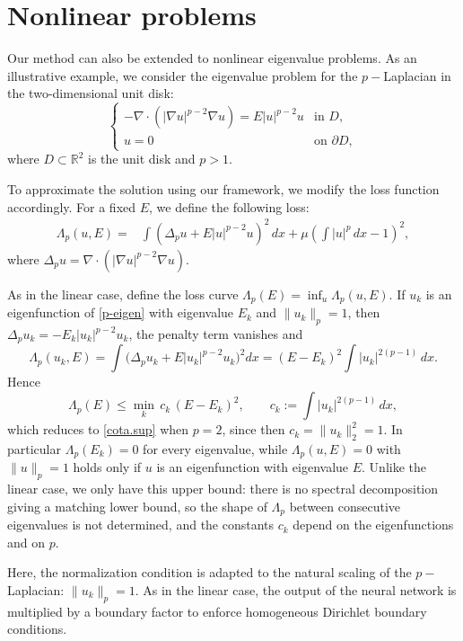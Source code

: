 \documentclass[11pt]{amsart}
\theoremstyle{definition}
\theoremstyle{remark}
\theoremstyle{plain}
\newcommand{\R}{\mathbb{R}}
\begin{document}
\section{Nonlinear problems} \label{sec.nolin}

Our method can also be extended to nonlinear eigenvalue problems. As an illustrative example, we consider the eigenvalue problem for the $p-$Laplacian in the two-dimensional unit disk:
\begin{equation}\label{p-eigen}
\begin{cases}
-\nabla \cdot (|\nabla u|^{p-2} \nabla u) = E |u|^{p-2} u & \text{in } D, \\
u = 0 & \text{on } \partial D,
\end{cases}
\end{equation}
where $D \subset \R^2$ is the unit disk and $p > 1$.

To approximate the solution using our framework, we modify the loss function accordingly. For a fixed $E$, we define the following loss:
\begin{align*}
\Lambda_p(u, E) = & \int \left( \Delta_p u + E |u|^{p-2} u \right)^2 \, dx + \mu \left( \int |u|^p\, dx - 1 \right)^2,
\end{align*}
where $\Delta_p u = \nabla \cdot (|\nabla u|^{p-2} \nabla u)$.

As in the linear case, define the loss curve
$\Lambda_p(E)=\inf_u \Lambda_p(u,E)$. If $u_k$ is an eigenfunction of
\eqref{p-eigen} with eigenvalue $E_k$ and $\|u_k\|_p=1$, then
$\Delta_p u_k=-E_k|u_k|^{p-2}u_k$, the penalty term vanishes and
\[
\Lambda_p(u_k,E)=\int\big(\Delta_p u_k+E|u_k|^{p-2}u_k\big)^2dx
=(E-E_k)^2\int |u_k|^{2(p-1)}\,dx .
\]
Hence
\[
\Lambda_p(E)\le \min_k\, c_k\,(E-E_k)^2,
\qquad c_k:=\int |u_k|^{2(p-1)}\,dx ,
\]
which reduces to \eqref{cota.sup} when $p=2$, since then $c_k=\|u_k\|_2^2=1$.
In particular $\Lambda_p(E_k)=0$ for every eigenvalue, while
$\Lambda_p(u,E)=0$ with $\|u\|_p=1$ holds only if $u$ is an eigenfunction
with eigenvalue $E$. Unlike the linear case, we only have this upper bound:
there is no spectral decomposition giving a matching lower bound, so the
shape of $\Lambda_p$ between consecutive eigenvalues is not determined, and
the constants $c_k$ depend on the eigenfunctions and on $p$.

Here, the normalization condition is adapted to the natural scaling of the $p-$Laplacian: $\|u_k\|_p = 1$. As in the linear case, the output of the neural network is multiplied by a boundary factor to enforce homogeneous Dirichlet boundary conditions.
\end{document}

